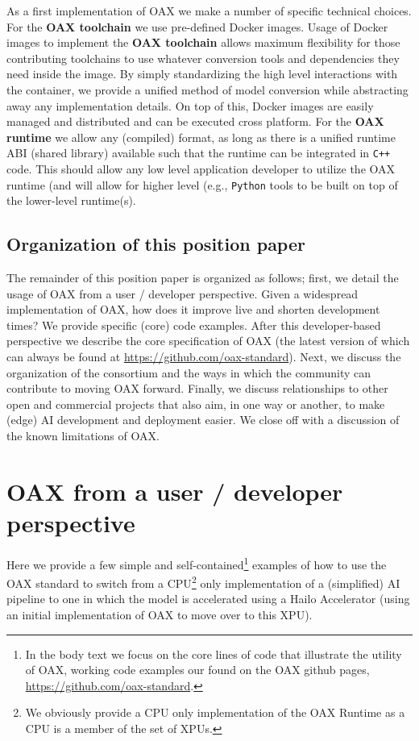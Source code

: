 \documentclass{article}
\newcommand{\oaxgit}{\href{https://github.com/oax-standard}{https://github.com/oax-standard}}
\begin{document}
As a first implementation of OAX we make a number of specific technical choices. For the \textbf{OAX toolchain} we use pre-defined Docker images. Usage of Docker images to implement the  \textbf{OAX toolchain} allows maximum flexibility for those contributing toolchains to use whatever conversion tools and dependencies they need inside the image. By simply standardizing the high level interactions with the container, we provide a unified method of model conversion while abstracting away any implementation details. On top of this, Docker images are easily managed and distributed and can be executed cross platform. For the  \textbf{OAX runtime} we allow any (compiled) format, as long as there is a unified runtime ABI (shared library) available such that the runtime can be integrated in \texttt{C++} code. This should allow any low level application developer to utilize the OAX runtime (and will allow for higher level (e.g., \texttt{Python} tools to be built on top of the lower-level runtime(s).

\subsection{Organization of this position paper}

The remainder of this position paper is organized as follows; first, we detail the usage of OAX from a user / developer perspective. Given a widespread implementation of OAX, how does it improve live and shorten development times? We provide specific (core) code examples. After this developer-based perspective we describe the core specification of OAX (the latest version of which can always be found at \oaxgit). Next, we discuss the organization of the consortium and the ways in which the community can contribute to moving OAX forward. Finally, we discuss relationships to other open and commercial projects that also aim, in one way or another, to make (edge) AI development and deployment easier. We close off with a discussion of the known limitations of OAX.

\section{OAX from a user / developer perspective}

Here we provide a few simple and self-contained\footnote{In the body text we focus on the core lines of code that illustrate the utility of OAX, working code examples our found on the OAX github pages, \oaxgit.} examples of how to use the OAX standard to switch from a CPU\footnote{We obviously provide a CPU only implementation of the OAX Runtime as a CPU is a member of the set of XPUs.} only implementation of a (simplified) AI pipeline to one in which the model is accelerated using a Hailo Accelerator (using an initial implementation of OAX to move over to this XPU). %
\end{document}
